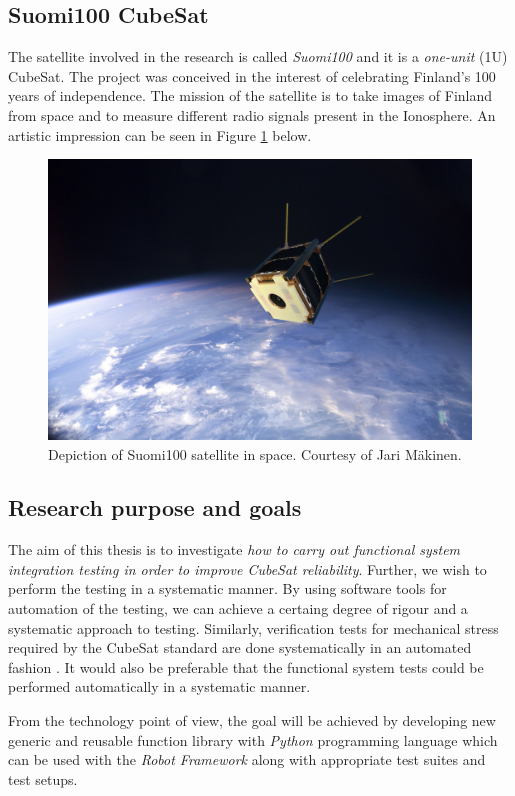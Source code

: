 \documentclass[english,12pt,a4paper,pdftex,elec,utf8]{aaltothesis}
\begin{document}
\subsection{Suomi100 CubeSat} 
The satellite involved in the research is called \textit{Suomi100} \cite{s100blogi} and it is a \textit{one-unit} (1U) CubeSat. The project was conceived in the interest of celebrating Finland's 100 years of independence. The mission of the satellite is to take images of Finland from space and to measure different radio signals present in the Ionosphere. An artistic impression can be seen in Figure \ref{s100intro} below.
\begin{figure}[!h]
\centering
\includegraphics[scale=0.2]{s100_orbit}
\caption{Depiction of Suomi100 satellite in space. Courtesy of Jari Mäkinen. \cite{s100blogi}}
\label{s100intro}
\end{figure} 
\subsection{Research purpose and goals}
The aim of this thesis is to investigate \textit{how to carry out
functional system integration testing in order to improve CubeSat reliability}. Further, we wish to perform the testing in a systematic manner. By using software tools for automation of the testing, we can achieve a certaing degree of rigour and a systematic approach to testing. Similarly, verification tests for mechanical stress required by the CubeSat standard are done systematically in an automated fashion \cite{cds}. It would also be preferable that the functional system tests could be performed automatically in a systematic manner.\par 
From the technology point of view, the goal will be achieved by developing new generic and reusable function library with \textit{Python} programming language which can be used with the \textit{Robot Framework} \cite{robotmain} along with appropriate test suites and test setups.\par 
\end{document}

